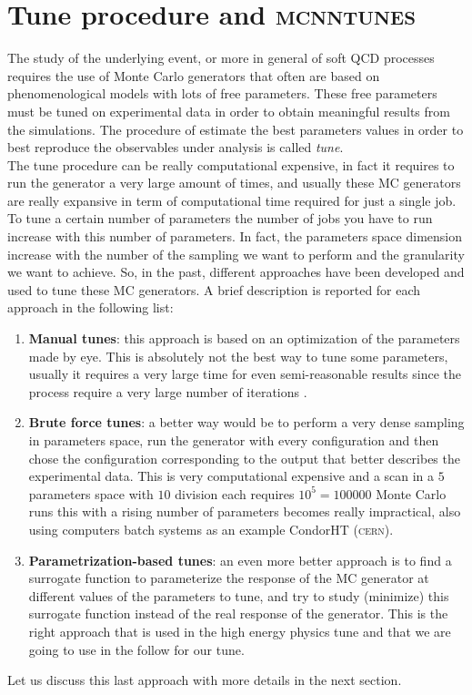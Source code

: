 \chapter{Tune procedure and \textsc{mcnntunes}}
\label{chap:TuneprocedureCP5TuneandMCNNTUNES}

The study of the underlying event, or more in general of soft QCD processes requires the use of Monte Carlo generators that often are based on phenomenological models with lots of free parameters. These free parameters must be tuned on experimental data in order to obtain meaningful results from the simulations. The procedure of estimate the best parameters values in order to best reproduce the observables under analysis is called \textit{tune}. 
\\
The tune procedure can be really computational expensive, in fact it requires to run the generator a very large amount of times, and usually these MC generators are really expansive in term of computational time required for just a single job.  
\\
To tune a certain number of parameters the number of jobs you have to run increase with this number of parameters. In fact, the parameters space dimension increase with the number of the sampling we want to perform and the granularity we want to achieve. So, in the past, different approaches have been developed and used to tune these MC generators. A brief description is reported for each approach in the following list:
\begin{enumerate}[label=\arabic*)]
	\item \textbf{Manual tunes}: this approach is based on an optimization of the parameters made by eye. This is absolutely not the best way to tune some parameters, usually it requires a very large time for even semi-reasonable results since the process require a very large number of iterations .   
	\item \textbf{Brute force tunes}: a better way would be to perform a very dense sampling in parameters space, run the generator with every configuration and then chose the configuration corresponding to the output that better describes the experimental data. This is very computational expensive and a scan in a $5$ parameters space with $10$ division each requires $10^5=100000$ Monte Carlo runs this with a rising number of parameters becomes really impractical, also using computers batch systems as an example CondorHT (\textsc{cern}).   
	\item \textbf{Parametrization-based tunes}: an even more better approach is to find a surrogate function to parameterize the response of the MC generator at different values of the parameters to tune, and try to study (minimize) this surrogate function instead of the real response of the generator. This is the right approach that is used in the high energy physics tune and that we are going to use in the follow for our tune.
\end{enumerate}
Let us discuss this last approach with more details in the next section.

